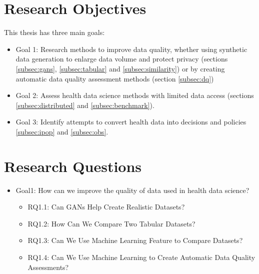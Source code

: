 
\section{Research Objectives}
This thesis has three main goals:


\begin{itemize}
    \item Goal 1: Research methods to improve data quality, whether using synthetic data generation to enlarge data volume and protect privacy (sections \ref{subsec:gans}, \ref{subsec:tabular} and \ref{subsec:similarity}) or by creating automatic data quality assessment methods (section \ref{subsec:dq})

    \item Goal 2: Assess health data science  methods with limited data access (sections \ref{subsec:distributed} and \ref{subsec:benchmark}).

    \item Goal 3: Identify attempts to convert health data into decisions and policies  \ref{subsec:ipop} and \ref{subsec:obs}.
\end{itemize}


\section{Research Questions}

\begin{itemize}
    \item Goal1: How can we improve the quality of data used in health data science?
    \begin{itemize}
        \item RQ1.1: Can GANs Help Create Realistic Datasets?
        \item RQ1.2: How Can We Compare Two Tabular Datasets?
        \item RQ1.3: Can We Use Machine Learning Feature to Compare Datasets?
        \item RQ1.4: Can We Use Machine Learning to Create Automatic Data Quality Assessments?
    \end{itemize}
\end{itemize}

